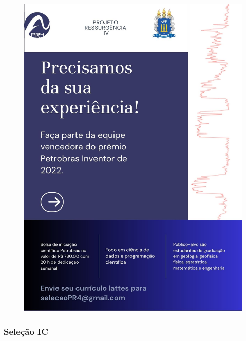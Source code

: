 \documentclass[aspectratio=169]{beamer} %
\begin{document}
{{\begin{frame}
	    \begin{figure}
		    \includegraphics[scale=0.4]{images/Bolsa_IC1.jpg}
	    \end{figure}

\end{frame} 
}

{
\begin{frame}
	\frametitle{Seleção IC}




\end{frame}}}
\end{document}
